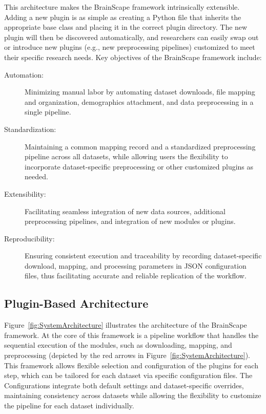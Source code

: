 This architecture makes the BrainScape framework intrinsically extensible. Adding a new plugin
is as simple as creating a Python file that inherits the appropriate base class 
and placing it in the correct plugin directory. 
The new plugin will then be discovered automatically, and 
researchers can easily swap out or introduce new plugins (e.g., new preprocessing pipelines) 
customized to meet their specific research needs.
Key objectives of the BrainScape framework include: 
\begin{description}
    \item[Automation:] Minimizing manual labor by automating dataset downloads, file mapping and organization, demographics attachment, and data preprocessing in a single pipeline.
    \item[Standardization:] Maintaining a common mapping record and a standardized preprocessing pipeline across all datasets, while allowing users the flexibility to incorporate dataset-specific preprocessing or other customized plugins as needed.
    \item[Extensibility:] Facilitating seamless integration of new data sources, additional preprocessing pipelines, and integration of new modules or plugins. 
    \item[Reproducibility:] Ensuring consistent execution and traceability by recording dataset-specific download, mapping, and processing parameters in JSON configuration files, thus facilitating accurate and reliable replication of the workflow.
\end{description}


\subsection{Plugin-Based Architecture}

Figure~\ref{fig:SystemArchitecture} illustrates the architecture of the BrainScape framework. 
At the core of this framework is a pipeline workflow that handles the sequential execution of the modules, 
such as downloading, mapping, and preprocessing (depicted by the red arrows in Figure~\ref{fig:SystemArchitecture}). 
This framework allows flexible selection and configuration of the plugins for each step, which can be tailored for 
each dataset via specific configuration files.
The Configurations integrate both default settings and dataset-specific overrides, maintaining consistency 
across datasets while allowing the flexibility to customize the pipeline for each dataset individually.

